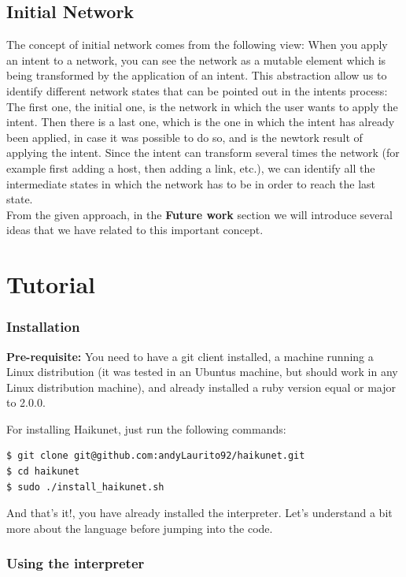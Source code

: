 \subsection{Initial Network}

The concept of initial network comes from the following view: When you apply an intent to a network, you can see the network as a mutable element which is being transformed by the application of an intent. This abstraction allow us to identify different network states that can be pointed out in the intents process: The first one, the initial one, is the network in which the user wants to apply the intent. Then there is a last one, which is the one in which the intent has already been applied, in case it was possible to do so, and is the newtork result of applying the intent. Since the intent can transform several times the network (for example first adding a host, then adding a link, etc.), we can identify all the intermediate states in which the network has to be in order to reach the last state. \\
From the given approach, in the \textbf{Future work} section we will introduce several ideas that we have related to this important concept.

\section{Tutorial}

\subsubsection{Installation}

\textbf{Pre-requisite:} You need to have a git client installed, a machine running a Linux distribution (it was tested in an Ubuntus machine, but should work in any Linux distribution machine), and already installed a ruby version equal or major to 2.0.0.

For installing Haikunet, just run the following commands:

\begin{lstlisting}[language=bash,breaklines=true]
$ git clone git@github.com:andyLaurito92/haikunet.git
$ cd haikunet
$ sudo ./install_haikunet.sh 
\end{lstlisting}

And that's it!, you have already installed the interpreter. Let's understand a bit more about the language before jumping into the code.

\subsubsection{Using the interpreter}

